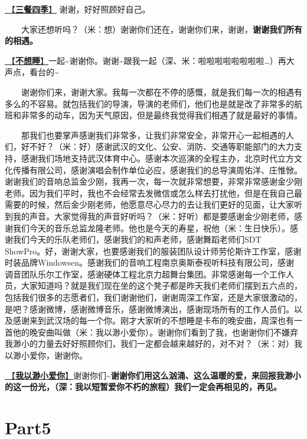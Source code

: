 \documentclass[]{ctexbook}
\begin{document}
\hyperref[three-meals-a-day]{🎵【\textbf{三餐四季}】} 谢谢，好好照顾好自己。

  大家还想听吗？（米：想）谢谢你们还在，谢谢你们来，谢谢，\textbf{谢谢我们所有的相遇。}

\hyperref[donot-want-to-sleep]{🎵【\textbf{不想睡}】}一起\textasciitilde 谢谢你。谢谢\textasciitilde 跟我一起（深、米：啦啦啦啦啦啦啦啦\ldots）再大声点，看台的\textasciitilde{}

  谢谢你们来，谢谢大家。我每一次都在不停的感慨，就是我们每一次的相遇有多么的不容易。就包括我们的导演，导演的老师们，他们也是就是改了非常多的航班和非常多的动车，因为天气原因，但是最终我觉得我们相遇了就是最好的事情。

  那我们也要掌声感谢我们非常多，让我们非常安全，非常开心一起相遇的人们，好不好？（米：好）感谢武汉的文化、公安、消防、交通等职能部门的大力支持，感谢我们场地支持武汉体育中心。感谢本次巡演的全程主办，北京时代立方文化传播有限公司，感谢演唱会制作单位必应，感谢我们的总导演周佑洋、庄惟惞。谢谢我们的音响总监金少刚，我再一次，每一次就非常想要，非常非常感谢金少刚老师。因为我们平时，我也不会经常去发微信或怎么样去打扰他，但是在我自己最需要的时候，然后金少刚老师，他愿意尽心尽力的去让我们更好的见面，让大家听到我的声音。大家觉得我的声音好听吗？（米：好听）都是要感谢金少刚老师，感谢我们今天的音乐总监龙隆老师。他也是今天的寿星，祝他（米：生日快乐）。感谢我们今天的乐队老师们，感谢我们的和声老师，感谢舞蹈老师们SDT ShowPro。好，谢谢大家，也要感谢我们的服装团队设计师劳伦斯许工作室，感谢时装品牌Windowsen。感谢我们的音响工程南京奥斯泰视听科技有限公司，感谢调音团队乐尔工作室，感谢硬体工程北京力超舞台集团。非常感谢每一个工作人员，大家知道吗？就是我们现在坐的这个凳子都是昨天我们老师们摆到五六点的，包括我们很多的志愿者们，我们谢谢他们，谢谢周深工作室，还是大家很激动的，是吧？感谢微博，感谢微博音乐，感谢微博演出，感谢现场所有的工作人员们。以及感谢来到武汉场的每一个你。刚才大家听的不想睡是卡布的晚安曲，周深也有一首他的晚安曲叫做（米：我以渺小爱你）。谢谢你们看到了我，也谢谢你们不嫌弃我渺小的力量去好好照顾你们，我们一定都会越来越好的，对不对？（米：对）我以渺小爱你，谢谢你。

\hyperref[loving-you-in-my-humble-way]{🎵【\textbf{我以渺小爱你}】}谢谢你们\textasciitilde{}\textbf{谢谢你们用这么汹涌、这么温暖的爱，来回报我渺小的这一份光，（深：我以短暂爱你不朽的旅程）我们一定会再相见的，再见。}

\section{Part5}\label{wuhan-20240727-part5}
\end{document}
